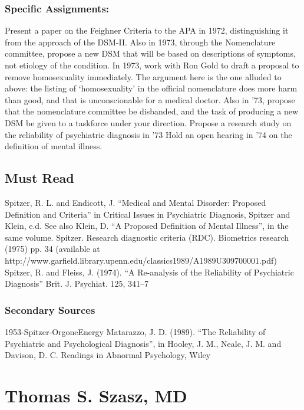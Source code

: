 \subsection{Specific Assignments:}
\label{specificassignments:}

Present a paper on the Feighner Criteria to the APA in 1972, distinguishing it from the approach of the DSM-II.
Also in 1973, through the Nomenclature committee, propose a new DSM that will be based on descriptions of symptoms, not etiology of the condition.
In 1973, work with Ron Gold to draft a proposal to remove homosexuality immediately. The argument here is the one alluded to above: the listing of `homosexuality' in the official nomenclature does more harm than good, and that is unconscionable for a medical doctor.
Also in '73, propose that the nomenclature committee be disbanded, and the task of producing a new DSM be given to a taskforce under your direction.
Propose a research study on the reliability of psychiatric diagnosis in '73
Hold an open hearing in '74 on the definition of mental illness.

\section{Must Read}
\label{mustread}

Spitzer, R. L. and Endicott, J. “Medical and Mental Disorder: Proposed Definition and Criteria” in Critical Issues in Psychiatric Diagnosis, Spitzer and Klein, e.d. See also Klein, D. “A Proposed Definition of Mental Illness”, in the same volume.
Spitzer. Research diagnostic criteria (RDC). Biometrics research (1975) pp. 34 (available at http:\slash \slash www.garfield.library.upenn.edu\slash classics1989\slash A1989U309700001.pdf)
Spitzer, R. and Fleiss, J. (1974). “A Re-analysis of the Reliability of Psychiatric Diagnosis” Brit. J. Psychiat. 125, 341--7

\subsection{Secondary Sources}
\label{secondarysources}

1953-Spitzer-OrgoneEnergy
Matarazzo, J. D. (1989). “The Reliability of Psychiatric and Psychological Diagnosis”, in Hooley, J. M., Neale, J. M. and Davison, D. C. Readings in Abnormal Psychology, Wiley

\chapter{Thomas S. Szasz, MD}
\label{thomass.szaszmd}

